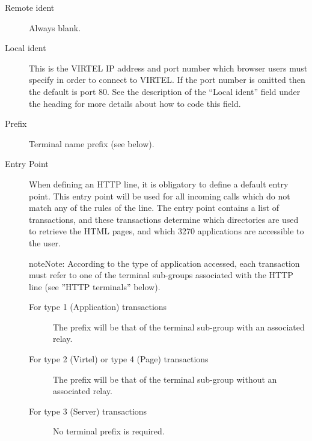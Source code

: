 \documentclass[letterpaper,10pt,english]{sphinxmanual}
\begin{document}
\ignorespaces \begin{description}
\item[{Remote ident}] \leavevmode
Always blank.

\item[{Local ident}] \leavevmode
This is the VIRTEL IP address and port number which browser users must specify in order to connect to VIRTEL. If the port number is omitted then the default is port 80. See the description of the
“Local ident” field under the heading {\hyperref[\detokenize{connectivity_guide:bookmark13}]{}} for more details about how to code this field.

\item[{Prefix}] \leavevmode
Terminal name prefix (see below).

\item[{Entry Point}] \leavevmode
When defining an HTTP line, it is obligatory to define a default entry point. This entry point will be used for all incoming calls which do not match any of the rules of the line. The entry point contains a list of transactions, and these transactions determine which directories are used to retrieve the HTML pages, and which 3270 applications are accessible to the user.

\begin{sphinxadmonition}{note}{Note:}
According to the type of application accessed, each transaction must
refer to one of the terminal sub-groups associated with the HTTP
line (see ”HTTP terminals” below).
\end{sphinxadmonition}
\begin{description}
\item[{For type 1 (Application) transactions}] \leavevmode
The prefix will be that of the terminal sub-group with an associated relay.

\item[{For type 2 (Virtel) or type 4 (Page) transactions}] \leavevmode
The prefix will be that of the terminal sub-group without an associated relay.

\item[{For type 3 (Server) transactions}] \leavevmode
No terminal prefix is required.

\end{description}


\end{description}
\end{document}

